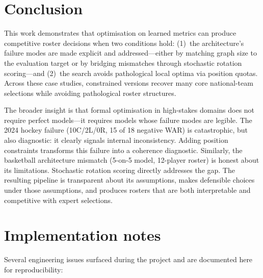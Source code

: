 \documentclass[12pt,letterpaper]{article}
\begin{document}
\section{Conclusion}

This work demonstrates that optimisation on learned metrics can produce
competitive roster decisions when two conditions hold: (1)~the
architecture's failure modes are made explicit and addressed---either
by matching graph size to the evaluation target or by bridging
mismatches through stochastic rotation scoring---and (2)~the search
avoids pathological local optima via position quotas.
Across these case studies, constrained versions recover many core
national-team selections while avoiding pathological roster structures.

The broader insight is that formal optimisation in high-stakes domains
does not require perfect models---it requires models whose failure
modes are legible.
The 2024 hockey failure (10C/2L/0R, 15 of 18 negative WAR) is
catastrophic, but also diagnostic: it clearly signals internal
inconsistency.
Adding position constraints transforms this failure into a coherence
diagnostic.
Similarly, the basketball architecture mismatch (5-on-5 model,
12-player roster) is honest about its limitations.
Stochastic rotation scoring directly addresses the gap.
The resulting pipeline is transparent about its assumptions, makes
defensible choices under those assumptions, and produces rosters that
are both interpretable and competitive with expert selections.

\appendix
\section{Implementation notes}

Several engineering issues surfaced during the project and are
documented here for reproducibility:
\end{document}
